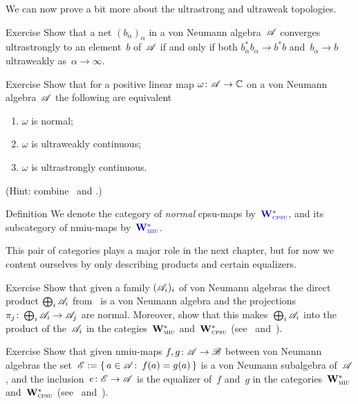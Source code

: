 \documentclass[a]{subfiles}
\begin{document}
\begin{parsec}%
\begin{point}%
We can now prove a bit more 
about the ultrastrong and ultraweak topologies.
\end{point}
\begin{point}[usconv]{Exercise}%
Show that a net $(b_\alpha)_\alpha$ 
in a von Neumann algebra~$\mathscr{A}$
converges ultrastrongly to an element~$b$
of~$\mathscr{A}$
if and only if
both $b_\alpha^*b_\alpha\longrightarrow b^*b$
and~$b_\alpha\longrightarrow b$
ultraweakly as~$\alpha\to\infty$.
\end{point}
\begin{point}[npuws]{Exercise}%
Show that for a positive linear map $\omega \colon \mathscr{A}\to\mathbb{C}$
on a von Neumann algebra~$\mathscr{A}$
the following are equivalent
\begin{enumerate}
\item
	$\omega$ is normal;
\item
	$\omega$ is ultraweakly continuous;
\item
	$\omega$ is ultrastrongly continuous.
\end{enumerate}
(Hint: combine~ and .)
\end{point}
\end{parsec}
\begin{parsec}%
\begin{point}{Definition}%
We denote 
the category of
\emph{normal} cpsu-maps
by~$\Define{\W{cpsu}}$,
and its subcategory of nmiu-maps
by~$\Define{\W{miu}}$.
\begin{point}%
This pair of categories plays a major role in the next
chapter, but for now we content ourselves
by only describing products and certain equalizers.
\end{point}
\end{point}
\begin{point}[vn-products]{Exercise}%
Show that
given a family $(\mathscr{A}_i)_i$
of von Neumann algebras
the direct product
$\bigoplus_i \mathscr{A}_i$
from~
is a von Neumann algebra
and  the projections
$\pi_j \colon \bigoplus_i \mathscr{A}_i\to\mathscr{A}_j$
are normal.
Moreover, show
that this makes~$\bigoplus_i \mathscr{A}_i$
into the  product of the~$\mathscr{A}_i$
in the categies~$\mathbf{W}^*_{\text{\textsc{miu}}}$ and~$\mathbf{W}^*_{\text{\textsc{cpsu}}}$
(see~ and~).
\end{point}
\begin{point}[vn-equalizers]{Exercise}%
Show that given nmiu-maps $f,g\colon \mathscr{A}\to\mathscr{B}$
between von Neumann algebras
the set~$\mathscr{E}:=\{\,a\in\mathscr{A}\colon\, f(a)=g(a)\,\}$
is a von Neumann subalgebra of~$\mathscr{A}$,
and the inclusion~$e\colon \mathscr{E}\to\mathscr{A}$
is the equalizer of~$f$ and~$g$ in the 
categories~$\mathbf{W}^*_{\text{\textsc{miu}}}$ and~$\mathbf{W}^*_{\text{\textsc{cpsu}}}$
(see~ and~).
\end{point}
\end{parsec}
\end{document}
